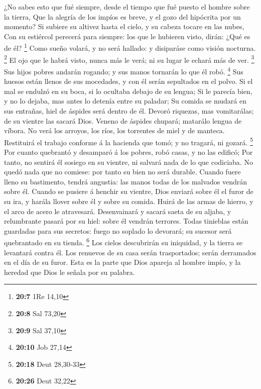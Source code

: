  ¿No sabes esto que fué siempre, desde el tiempo que fué
puesto el hombre sobre la tierra,  Que la alegría de los
impíos es breve, y el gozo del hipócrita por un momento? 
Si subiere su altivez hasta el cielo, y su cabeza tocare en las nubes,
 Con su estiércol perecerá para siempre: los que le
hubieren visto, dirán: ¿Qué es de él? \footnote{\textbf{20:7} 1Re 14,10}
 Como sueño volará, y no será hallado: y disiparáse como
visión nocturna. \footnote{\textbf{20:8} Sal 73,20}  El
ojo que le habrá visto, nunca más le verá; ni su lugar le echará más de
ver. \footnote{\textbf{20:9} Sal 37,10}  Sus hijos pobres
andarán rogando; y sus manos tornarán lo que él robó. \footnote{\textbf{20:10}
  Job 27,14}  Sus huesos están llenos de sus mocedades, y
con él serán sepultados en el polvo.  Si el mal se
endulzó en su boca, si lo ocultaba debajo de su lengua; 
Si le parecía bien, y no lo dejaba, mas antes lo detenía entre su
paladar;  Su comida se mudará en sus entrañas, hiel de
áspides será dentro de él.  Devoró riquezas, mas
vomitarálas; de su vientre las sacará Dios.  Veneno de
áspides chupará; matarálo lengua de víbora.  No verá los
arroyos, los ríos, los torrentes de miel y de manteca. 
Restituirá el trabajo conforme á la hacienda que tomó; y no tragará, ni
gozará. \footnote{\textbf{20:18} Deut 28,30-33}  Por
cuanto quebrantó y desamparó á los pobres, robó casas, y no las edificó;
 Por tanto, no sentirá él sosiego en su vientre, ni
salvará nada de lo que codiciaba.  No quedó nada que no
comiese: por tanto su bien no será durable.  Cuando fuere
lleno su bastimento, tendrá angustia: las manos todas de los malvados
vendrán sobre él.  Cuando se pusiere á henchir su
vientre, Dios enviará sobre él el furor de su ira, y harála llover sobre
él y sobre su comida.  Huirá de las armas de hierro, y el
arco de acero le atravesará.  Desenvainará y sacará saeta
de su aljaba, y relumbrante pasará por su hiel: sobre él vendrán
terrores.  Todas tinieblas están guardadas para sus
secretos: fuego no soplado lo devorará; su sucesor será quebrantado en
su tienda. \footnote{\textbf{20:26} Deut 32,22}  Los
cielos descubrirán su iniquidad, y la tierra se levantará contra él.
 Los renuevos de su casa serán trasportados; serán
derramados en el día de su furor.  Esta es la parte que
Dios apareja al hombre impío, y la heredad que Dios le señala por su
palabra.

